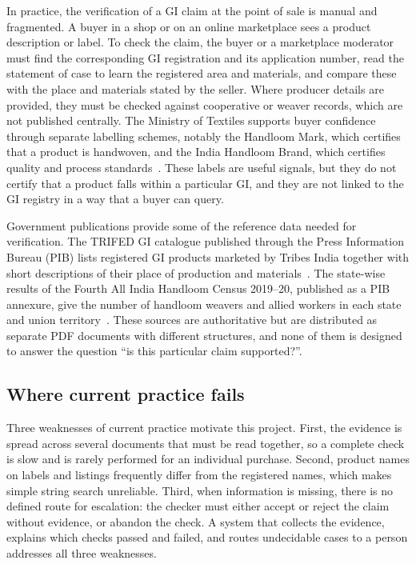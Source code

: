 In practice, the verification of a GI claim at the point of sale is manual and fragmented. A buyer in
a shop or on an online marketplace sees a product description or label. To check the claim, the buyer
or a marketplace moderator must find the corresponding GI registration and its application number,
read the statement of case to learn the registered area and materials, and compare these with the
place and materials stated by the seller. Where producer details are provided, they must be checked
against cooperative or weaver records, which are not published centrally. The Ministry of Textiles
supports buyer confidence through separate labelling schemes, notably the Handloom Mark, which
certifies that a product is handwoven, and the India Handloom Brand, which certifies quality and
process standards~\cite{handloommark}. These labels are useful signals, but they do not certify that a
product falls within a particular GI, and they are not linked to the GI registry in a way that a buyer
can query.

Government publications provide some of the reference data needed for verification. The TRIFED GI
catalogue published through the Press Information Bureau (PIB) lists registered GI products marketed
by Tribes India together with short descriptions of their place of production and
materials~\cite{pibgi}. The state-wise results of the Fourth All India Handloom Census 2019--20,
published as a PIB annexure, give the number of handloom weavers and allied workers in each state and
union territory~\cite{pibcensus}. These sources are authoritative but are distributed as separate PDF
documents with different structures, and none of them is designed to answer the question ``is this
particular claim supported?''.

\subsection{Where current practice fails}

Three weaknesses of current practice motivate this project. First, the evidence is spread across
several documents that must be read together, so a complete check is slow and is rarely performed
for an individual purchase. Second, product names on labels and listings frequently differ from the
registered names, which makes simple string search unreliable. Third, when information is missing,
there is no defined route for escalation: the checker must either accept or reject the claim without
evidence, or abandon the check. A system that collects the evidence, explains which checks passed and
failed, and routes undecidable cases to a person addresses all three weaknesses.

